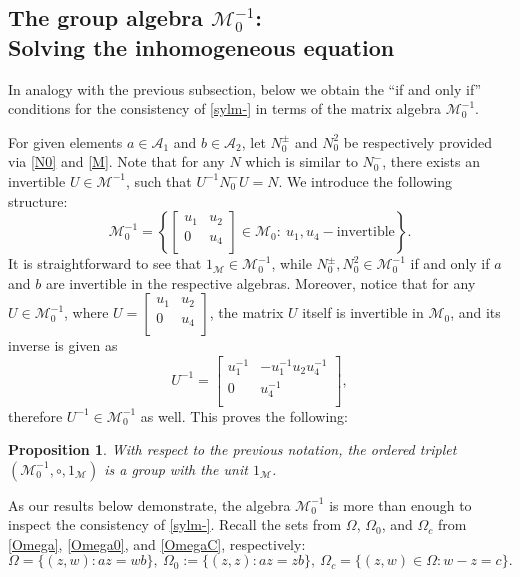 \documentclass{article}
\newtheorem{proposition}{Proposition}[section]
\theoremstyle{definition}
\def\A{{\mathcal{A}}}
\newcommand{\mat}[4]{\left[\begin{array}{cc}#1 & #2 \\ #3 & #4 \\
	\end{array}\right]}
\begin{document}
\subsection{The group algebra $\mathcal{M}_0^{-1}$:\\Solving the inhomogeneous equation }
In analogy with the previous subsection, below we obtain the ``if and only if'' conditions for the consistency of \eqref{sylm-} in terms of the matrix algebra $\mathcal{M}_0^{-1}$. 

For given elements $a\in\A_1$ and $b\in\A_2$, let $N_0^\pm$ and $N_0^2$ be respectively provided via \eqref{N0} and \eqref{M}. Note that for any $N$ which is similar to $N_0^-$, there exists an invertible $U\in\mathcal{M}^{-1}$, such that $U^{-1}N_0^- U=N$. We introduce the following structure:
\begin{equation}\label{M0-1}\mathcal{M}^{-1}_0=\left\{\mat{u_1}{u_2}{0}{u_4}\in\mathcal{M}_0: \ u_1, u_4-\textrm{invertible}\right\}.\end{equation}
It is straightforward to see that $1_{\mathcal{M}}\in\mathcal{M}^{-1}_0$, while $N^\pm_0, N_0^2\in\mathcal{M}_0^{-1}$ if
 and only if $a$ and $b$ are invertible in the respective algebras. Moreover, notice that for any $U\in\mathcal{M}^{-1}_0$, where $U=\mat{u_1}{u_2}{0}{u_4}$, the matrix $U$ itself is invertible in $\mathcal{M}_0$, and its inverse is given as
$$U^{-1}=\mat{u_1^{-1}}{-u_1^{-1}u_2 u_4^{-1}}{0}{u_4^{-1}},$$
therefore $U^{-1}\in\mathcal{M}^{-1}_0$ as well. This proves the following:
\begin{proposition} With respect to the previous notation, the ordered triplet $\left(\mathcal{M}^{-1}_0,\circ,1_{\mathcal{M}}\right)$ is a group with the unit $1_{\mathcal{M}}$.
\end{proposition}
\noindent As our results below demonstrate, the algebra $\mathcal{M}_0^{-1}$ is more than enough to inspect the consistency of \eqref{sylm-}. Recall the sets from $\Omega$, $\Omega_0$, and $\Omega_c$ from \eqref{Omega}, \eqref{Omega0}, and \eqref{OmegaC}, respectively:
$$\Omega=\{(z,w): az=wb\},\ \Omega_0:=\{(z,z): az=zb\},\ \Omega_c=\{(z,w)\in\Omega: w-z=c\}.$$
\end{document}
